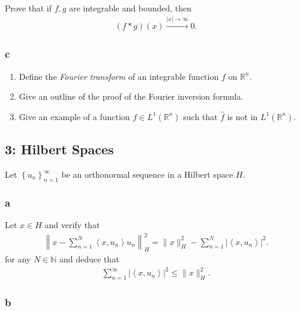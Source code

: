 Prove that if \(f, g\) are integrable and bounded, then
\begin{align*} (f\ast g)(x) \overset{{\left\lvert {x} \right\rvert}\to\infty}\to 0 .\end{align*}

\hypertarget{c}{%
\subsubsection{c}\label{c}}

\begin{enumerate}
\def\labelenumi{\arabic{enumi}.}
\tightlist
\item
  Define the \emph{Fourier transform} of an integrable function \(f\) on
  \({\mathbb{R}}^n\).
\item
  Give an outline of the proof of the Fourier inversion formula.
\item
  Give an example of a function \(f\in L^1({\mathbb{R}}^n)\) such that
  \(\widehat{f}\) is not in \(L^1({\mathbb{R}}^n)\).
\end{enumerate}

\hypertarget{hilbert-spaces}{%
\subsection{3: Hilbert Spaces}\label{hilbert-spaces}}

\label{hilbert_space_exam_question}

Let \(\left\{{u_n}\right\}_{n=1}^\infty\) be an orthonormal sequence in
a Hilbert space \(H\).

\hypertarget{a-3}{%
\subsubsection{a}\label{a-3}}

Let \(x\in H\) and verify that
\begin{align*} \left\|x-\sum_{n=1}^{N}\left\langle x, u_{n}\right\rangle u_{n}\right\|_H^{2} = \|x\|_H^{2}-\sum_{n=1}^{N}\left|\left\langle x, u_{n}\right\rangle\right|^{2} .\end{align*}
for any \(N\in {\mathbb{N}}\) and deduce that
\begin{align*} \sum_{n=1}^{\infty}\left|\left\langle x, u_{n}\right\rangle\right|^{2} \leq\|x\|_H^{2} .\end{align*}

\hypertarget{b-3}{%
\subsubsection{b}\label{b-3}}

